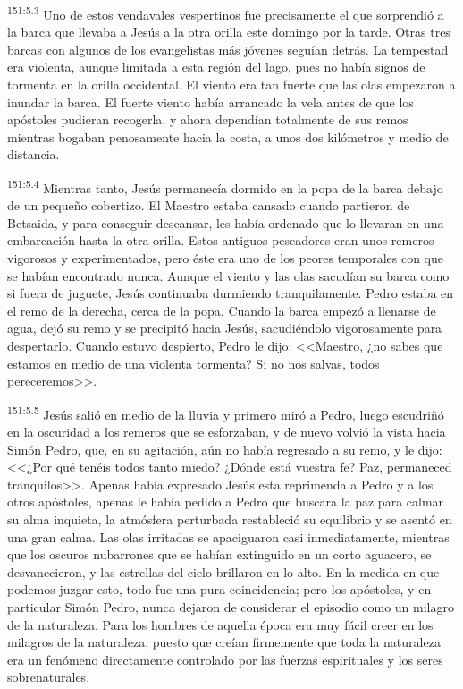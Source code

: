 \par 
\textsuperscript{151:5.3} Uno de estos vendavales vespertinos fue precisamente el que sorprendió a la barca que llevaba a Jesús a la otra orilla este domingo por la tarde. Otras tres barcas con algunos de los evangelistas más jóvenes seguían detrás. La tempestad era violenta, aunque limitada a esta región del lago, pues no había signos de tormenta en la orilla occidental. El viento era tan fuerte que las olas empezaron a inundar la barca. El fuerte viento había arrancado la vela antes de que los apóstoles pudieran recogerla, y ahora dependían totalmente de sus remos mientras bogaban penosamente hacia la costa, a unos dos kilómetros y medio de distancia.

\par 
\textsuperscript{151:5.4} Mientras tanto, Jesús permanecía dormido en la popa de la barca debajo de un pequeño cobertizo. El Maestro estaba cansado cuando partieron de Betsaida, y para conseguir descansar, les había ordenado que lo llevaran en una embarcación hasta la otra orilla. Estos antiguos pescadores eran unos remeros vigorosos y experimentados, pero éste era uno de los peores temporales con que se habían encontrado nunca. Aunque el viento y las olas sacudían su barca como si fuera de juguete, Jesús continuaba durmiendo tranquilamente. Pedro estaba en el remo de la derecha, cerca de la popa. Cuando la barca empezó a llenarse de agua, dejó su remo y se precipitó hacia Jesús, sacudiéndolo vigorosamente para despertarlo. Cuando estuvo despierto, Pedro le dijo: <<Maestro, ¿no sabes que estamos en medio de una violenta tormenta? Si no nos salvas, todos pereceremos>>.

\par 
\textsuperscript{151:5.5} Jesús salió en medio de la lluvia y primero miró a Pedro, luego escudriñó en la oscuridad a los remeros que se esforzaban, y de nuevo volvió la vista hacia Simón Pedro, que, en su agitación, aún no había regresado a su remo, y le dijo: <<¿Por qué tenéis todos tanto miedo? ¿Dónde está vuestra fe? Paz, permaneced tranquilos>>. Apenas había expresado Jesús esta reprimenda a Pedro y a los otros apóstoles, apenas le había pedido a Pedro que buscara la paz para calmar su alma inquieta, la atmósfera perturbada restableció su equilibrio y se asentó en una gran calma. Las olas irritadas se apaciguaron casi inmediatamente, mientras que los oscuros nubarrones que se habían extinguido en un corto aguacero, se desvanecieron, y las estrellas del cielo brillaron en lo alto. En la medida en que podemos juzgar esto, todo fue una pura coincidencia; pero los apóstoles, y en particular Simón Pedro, nunca dejaron de considerar el episodio como un milagro de la naturaleza. Para los hombres de aquella época era muy fácil creer en los milagros de la naturaleza, puesto que creían firmemente que toda la naturaleza era un fenómeno directamente controlado por las fuerzas espirituales y los seres sobrenaturales.

